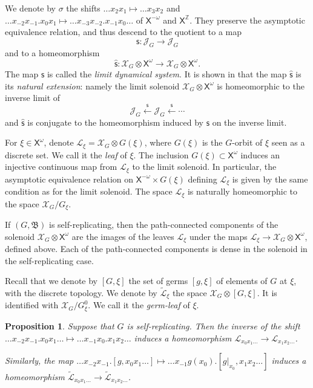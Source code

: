 \documentclass[11pt]{amsart}
\newcommand{\Z}{\ensuremath{\mathbb{Z}}}%
\newcommand{\bim}{\mathfrak{B}}
\newcommand{\arr}{\longrightarrow}
\newcommand{\lims}[1][G]{\mathcal{J}_{#1}}
\newcommand{\limg}[1][G]{\mathcal{X}_{#1}}
\newcommand{\xo}{\alb^\omega}
\newcommand{\leaf}{\mathcal{L}}
\newcommand{\leaftilde}{\widetilde{\leaf}}
\newcommand{\xmo}{\alb^{-\omega}}
\newcommand{\alb}{\ensuremath{\mathsf{X}}}%
\theoremstyle{definition}
\theoremstyle{plain}
\newtheorem{main thm}{Theorem}
\newtheorem{prop}[defin]{Proposition}
\theoremstyle{remark}
\theoremstyle{plain}
\begin{document}
 We denote by $\sigma$ the 
shifts $\ldots x_2x_1\mapsto \ldots x_3x_2$ and $\ldots x_{-2}x_{-1}.x_0x_1\mapsto \ldots x_{-3}x_{-2}.x_{-1}x_0\ldots$ of $\xmo$ and $\alb^{\Z}$. They preserve the asymptotic equivalence relation, and thus descend to the quotient to a map
\[\mathsf{s}\colon \lims\to \lims\]
 and to a homeomorphism
\[\widehat{\mathsf{s}}\colon \limg\otimes\xo \to \limg\otimes\xo. \]
The map $\mathsf{s}$ is called the \emph{limit dynamical system}. It is shown in \cite[\S5.6]{Nek:book} that  the map $\widehat{\mathsf{s}}$ is  its \emph{natural extension}: namely the limit solenoid $\limg\otimes\xo$ is homeomorphic to the inverse limit of 
\[\lims \xleftarrow{\mathsf{s}}\lims\xleftarrow{\mathsf{s}}\cdots \]
and $\widehat{\mathsf{s}}$ is conjugate to the homeomorphism induced by $\mathsf{s}$ on the inverse limit.

For $\xi\in\alb^\omega$, denote $\leaf_\xi=\limg\otimes G(\xi)$, where $G(\xi)$ is the $G$-orbit of $\xi$ seen as a discrete set. We call it the \emph{leaf} of $\xi$. The inclusion $G(\xi)\subset\xo$ induces an injective continuous map from $\leaf_\xi$ to the limit solenoid. In particular, the asymptotic equivalence relation on $\alb^{-\omega}\times G(\xi)$ defining $\leaf_\xi$ is given by the same condition as for the limit solenoid. The space $\leaf_\xi$ is naturally homeomorphic to the space $\limg/G_\xi$.

If $(G, \bim)$ is self-replicating, then the path-connected components of the solenoid $\limg\otimes\xo$ are the images of the leaves $\leaf_\xi$ under the maps $\leaf_\xi\arr\limg\otimes\xo$, defined above. Each of the path-connected components is dense in the solenoid in the self-replicating case.

Recall that we denote by $[G, \xi]$ the set of germs $[g, \xi]$ of elements of $G$ at $\xi$, with the discrete topology. We denote by $\widetilde{\leaf}_\xi$ the space $\limg\otimes [G, \xi]$. It is identified with $\limg/G^0_\xi$. We call it the \emph{germ-leaf} of $\xi$.

\begin{prop}
\label{pr:leavesmap}
    Suppose that $G$ is self-replicating. Then the inverse of the shift $\ldots x_{-2}x_{-1}. x_0x_1\ldots\mapsto \ldots x_{-1}x_0. x_1x_2\ldots$ induces a homeomorphism $\leaf_{x_0x_1\ldots}\arr\leaf_{x_1x_2\ldots}$.

    Similarly, the map $\ldots x_{-2}x_{-1}.[g, x_0x_1\ldots]\mapsto \ldots x_{-1}g(x_0).[g|_{x_0}, x_1x_2\ldots]$ induces a homeomorphism $\leaftilde_{x_0x_1\ldots}\arr\leaftilde_{x_1x_2\ldots}$.
\end{prop}    
\end{document}
